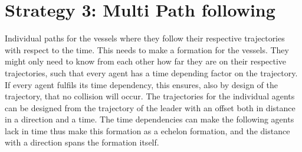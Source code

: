 \section{Strategy 3: Multi Path following}
Individual paths for the vessels where they follow their respective trajectories with respect to the time. This needs to make a formation for the vessels. They might only need to know from each other how far they are on their respective trajectories, such that every agent has a time depending factor on the trajectory. If every agent fulfils its time dependency, this ensures, also by design of the trajectory, that no collision will occur. The trajectories for the individual agents can be designed from the trajectory of the leader with an offset both in distance in a direction and a time. The time dependencies can make the following agents lack in time thus make this formation as a echelon formation, and the distance with a direction spans the formation itself. 